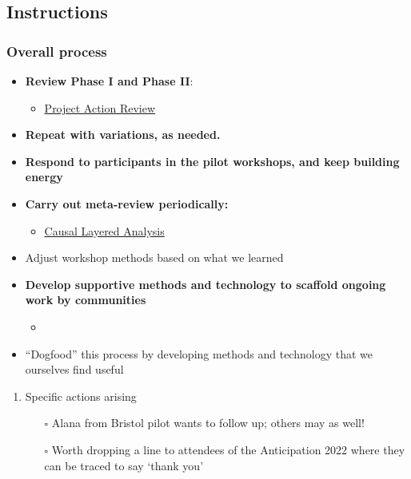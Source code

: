 \documentclass[11pt]{article}
\begin{document}
\subsection{Instructions}
\label{sec:org7206ec0}

\subsubsection{Overall process}
\label{sec:org0b7c145}

\begin{itemize}
\item \textbf{Review Phase I and Phase II}:
\begin{itemize}
\item \hyperref[f5a1bc15-5abb-44d6-8f7a-e254974c9002]{Project Action Review}
\end{itemize}
\item \textbf{Repeat with variations, as needed.}
\item \textbf{Respond to participants in the pilot workshops, and keep building energy}
\item \textbf{Carry out meta-review periodically:}
\begin{itemize}
\item \hyperref[56ce8d31-d3d6-4493-bb41-b07d810afbcc]{Causal Layered Analysis}
\end{itemize}
\item Adjust workshop methods based on what we learned
\item \textbf{Develop supportive methods and technology to scaffold ongoing work by communities}
\begin{itemize}
\item{}
\end{itemize}
\item ``Dogfood'' this process by developing methods and technology that we ourselves find useful
\end{itemize}

\begin{enumerate}
\item Specific actions arising
\label{sec:org5d19d65}

\begin{itemize}
\item[{$\square$}] Alana from Bristol pilot wants to follow up; others may as well!
\item[{$\square$}] Worth dropping a line to attendees of the Anticipation 2022 where they can be traced to say ‘thank you’
\end{itemize}
\end{enumerate}
\end{document}
